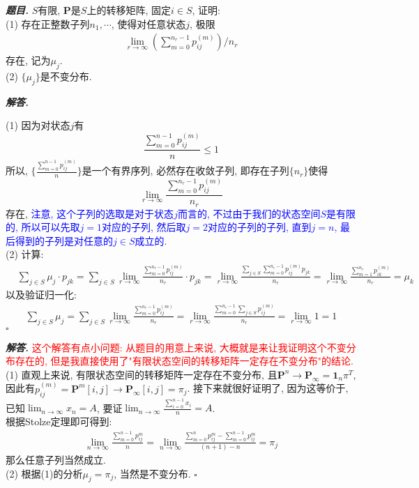 \documentclass[10pt, a4paper, oneside]{ctexart}
\newenvironment{problem}{\begin{framed}\par\noindent\textbf{\textit{题目. }}}{\end{framed}\par}
\newenvironment{solution}{%
  \par\noindent\textbf{\textit{解答. }}\ignorespaces
}{%
  \hfill\ensuremath{\square}\par %
}
\begin{document}
\begin{problem}
$S$有限, $\mathbf{P}$是$S$上的转移矩阵, 固定$i\in S$, 证明:\\
(1) 存在正整数子列$n_1,\cdots$, 使得对任意状态$j$, 极限
\begin{align*}
    \lim_{r\to\infty} \left(\sum_{m=0}^{n_r-1}p_{ij}^{(m)}\right)/ n_r
\end{align*}
存在, 记为$\mu_j$.\\
(2) $\{\mu_j\}$是不变分布.
\end{problem}
\begin{solution}
(1) 因为对状态$j$有
$$\frac{\sum_{m=0}^{n-1}p_{ij}^{(m)}}{n}\leq 1$$
所以, $\{\frac{\sum_{m=0}^{n-1}p_{ij}^{(m)}}{n}\}$是一个有界序列, 必然存在收敛子列, 即存在子列$\{n_r\}$使得
$$\lim_{r\to \infty}\frac{\sum_{m=0}^{n_r-1}p_{ij}^{(m)}}{n_r}$$
存在, \textcolor{blue}{注意, 这个子列的选取是对于状态$j$而言的, 不过由于我们的状态空间$S$是有限的, 所以可以先取$j=1$对应的子列, 然后取$j=2$对应的子列的子列, 直到$j=n$, 最后得到的子列是对任意的$j\in S$成立的}.\\
(2) 计算:
\begin{align*}
    &\sum_{j\in S}\mu_j\cdot p_{jk}=\sum_{j\in S}\lim_{r\to \infty} \frac{\sum_{m=0}^{n_r-1}p_{ij}^{(m)}}{n_r}\cdot p_{jk}=\lim_{r\to\infty}\frac{\sum_{j\in S}\sum_{m=0}^{n_r-1}p_{ij}^{(m)}p_{jk}}{n_r}=\lim_{r\to \infty}\frac{\sum_{m=1}^{n_r}p_{ik}^{(m)}}{n_r}=\mu_k
\end{align*}
以及验证归一化:
\begin{align*}
    \sum_{j\in S}\mu_j=\sum_{j\in S}\lim_{r\to \infty} \frac{\sum_{m=0}^{n_r-1}p_{ij}^{(m)}}{n_r}=\lim_{r\to\infty}\frac{\sum_{m=0}^{n_r-1}\sum_{j\in S}p_{ij}^{(m)}}{n_r}=\lim_{r\to \infty}1=1
\end{align*}
\end{solution}
\begin{solution}\textcolor{red}{这个解答有点小问题: 从题目的用意上来说, 大概就是来让我证明这个不变分布存在的, 但是我直接使用了"有限状态空间的转移矩阵一定存在不变分布"的结论.}\\
(1) 直观上来说, 有限状态空间的转移矩阵一定存在不变分布, 且$\mathbf{P}^n\to \mathbf{P}_{\infty}=\mathbf{1}_n\pi^T$, 因此有$p_{ij}^{(m)}=\mathbf{P}^m[i,j]\to \mathbf{P}_{\infty}[i,j]=\pi_j$. 接下来就很好证明了, 因为这等价于, 已知$\lim_{n\to \infty} x_{n}=A$, 要证$\lim_{n \to \infty} \frac{\sum_{i=0}^{n-1}x_{i}}{n}=A$.\\
根据Stolze定理即可得到:
\begin{align*}
    \lim_{n\to\infty} \frac{\sum_{m=0}^{n-1} p_{ij}^{m} }{n} =\lim_{n\to \infty} \frac{\sum_{m=0}^{n} p_{ij}^{m} - \sum_{m=0}^{n-1} p_{ij}^{m} }{(n+1)-n} = \pi_j
\end{align*}
那么任意子列当然成立.\\
(2) 根据(1)的分析$\mu_j=\pi_j$, 当然是不变分布.
\end{solution}
\end{document}
